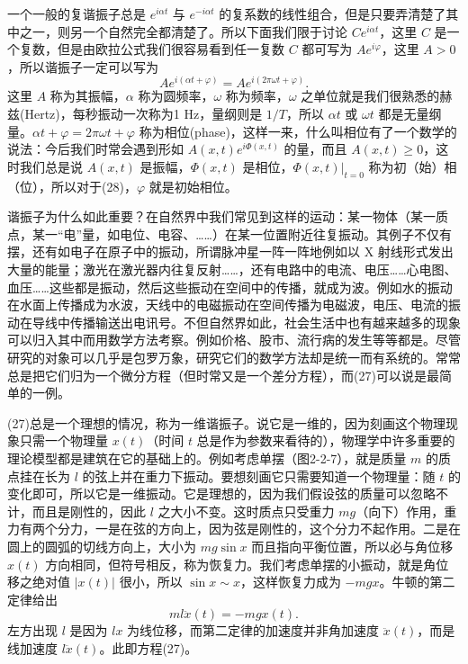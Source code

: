 一个一般的复谐振子总是 $e^{i\alpha t}$ 与 $e^{-i\alpha t}$ 的复系数的线性组合，但是只要弄清楚了其中之一，则另一个自然完全都清楚了。所以下面我们限于讨论 $Ce^{i\alpha t}$，这里 $C$ 是一个复数，但是由欧拉公式我们很容易看到任一复数 $C$ 都可写为 $Ae^{i\varphi}$，这里 $A>0$，所以谐振子一定可以写为
\[
Ae^{i(\alpha t+\varphi)}=Ae^{i(2\pi\omega t+\varphi)}. \tag{28}
\]
这里 $A$ 称为其振幅，$\alpha$ 称为圆频率，$\omega$ 称为频率，$\omega$ 之单位就是我们很熟悉的赫兹(Hertz)，每秒振动一次称为1 Hz，量纲则是 $1/T$，所以 $\alpha t$ 或 $\omega t$ 都是无量纲量。$\alpha t+\varphi=2\pi\omega t+\varphi$ 称为相位(phase)，这样一来，什么叫相位有了一个数学的说法：今后我们时常会遇到形如 $A(x,t)e^{i\Phi(x,t)}$ 的量，而且 $A(x,t)\ge0$，这时我们总是说 $A(x,t)$ 是振幅，$\Phi(x,t)$ 是相位，$\Phi(x,t)|_{t=0}$ 称为初（始）相（位），所以对于(28)，$\varphi$ 就是初始相位。

谐振子为什么如此重要？在自然界中我们常见到这样的运动：某一物体（某一质点，某一“电”量，如电位、电容、……）在某一位置附近往复振动。其例子不仅有摆，还有如电子在原子中的振动，所谓脉冲星一阵一阵地例如以 X 射线形式发出大量的能量；激光在激光器内往复反射……，还有电路中的电流、电压……心电图、血压……这些都是振动，然后这些振动在空间中的传播，就成为波。例如水的振动在水面上传播成为水波，天线中的电磁振动在空间传播为电磁波，电压、电流的振动在导线中传播输送出电讯号。不但自然界如此，社会生活中也有越来越多的现象可以归入其中而用数学方法考察。例如价格、股市、流行病的发生等等都是。尽管研究的对象可以几乎是包罗万象，研究它们的数学方法却是统一而有系统的。常常总是把它们归为一个微分方程（但时常又是一个差分方程），而(27)可以说是最简单的一例。

(27)总是一个理想的情况，称为一维谐振子。说它是一维的，因为刻画这个物理现象只需一个物理量 $x(t)$（时间 $t$ 总是作为参数来看待的），物理学中许多重要的理论模型都是建筑在它的基础上的。例如考虑单摆（图2-2-7），就是质量 $m$ 的质点挂在长为 $l$ 的弦上并在重力下振动。要想刻画它只需要知道一个物理量：随 $t$ 的变化即可，所以它是一维振动。它是理想的，因为我们假设弦的质量可以忽略不计，而且是刚性的，因此 $l$ 之大小不变。这时质点只受重力 $mg$（向下）作用，重力有两个分力，一是在弦的方向上，因为弦是刚性的，这个分力不起作用。二是在圆上的圆弧的切线方向上，大小为 $mg\sin x$ 而且指向平衡位置，所以必与角位移 $x(t)$ 方向相同，但符号相反，称为恢复力。我们考虑单摆的小振动，就是角位移之绝对值 $|x(t)|$ 很小，所以 $\sin x\sim x$，这样恢复力成为 $-mgx$。牛顿的第二定律给出
\[
ml\ddot x(t)=-mgx(t).
\]
左方出现 $l$ 是因为 $lx$ 为线位移，而第二定律的加速度并非角加速度 $\ddot x(t)$，而是线加速度 $l\ddot x(t)$。此即方程(27)。

